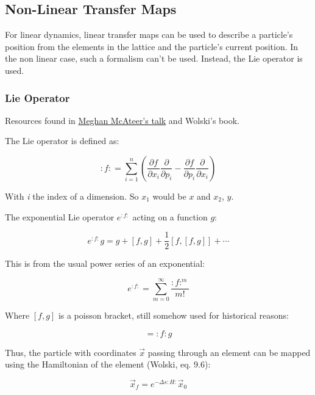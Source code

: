 \documentclass[openright,twoside,headsepline,bibliography=totoc]{scrbook}
\begin{document}
\hypertarget{non-linear-transfer-maps}{%
\subsection{Non-Linear Transfer Maps}\label{non-linear-transfer-maps}}

For linear dynamics, linear transfer maps can be used to describe a
particle's position from the elements in the lattice and the particle's
current position. In the non linear case, such a formalism can't be
used. Instead, the Lie operator is used.

\hypertarget{lie-operator}{%
\subsubsection{Lie Operator}\label{lie-operator}}

Resources found in
\href{https://mlegarre.web.cern.ch/mlegarre/Courses/Meghan_RDTpresentation.pdf}{Meghan
McAteer's talk} and Wolski's book.

The Lie operator is defined as:

\[
\colon f \colon = \sum^n_{i=1} \left(\frac{\partial f}{\partial x_i} \frac{\partial}{\partial p_i} 
                           - \frac{\partial f}{\partial p_i} \frac{\partial}{\partial x_i}
                      \right)
\]

With \emph{i} the index of a dimension. So \(x_1\) would be \(x\) and
\(x_2\), \(y\).

The exponential Lie operator \(e^{:f:}\) acting on a function \(g\):

\begin{equation}e^{:f:}g = g + [f, g] + \frac{1}{2} [f, [f, g]] + \cdots\label{eq:Lie}\end{equation}

This is from the usual power series of an exponential:

\[e^{:f:} = \sum^{\infty}_{m=0} \frac{:f:^m}{m!}\]

Where \([f, g]\) is a poisson bracket, still somehow used for historical
reasons:

\begin{equation}[f, g] = \colon f \colon g
\label{eq:poisson_bracket}\end{equation}

Thus, the particle with coordinates \(\vec{x}\) passing through an
element can be mapped using the Hamiltonian of the element (Wolski, eq.
9.6):

\begin{equation}\vec{x}_f = e^{-\Delta s:H:} \vec{x}_0\label{eq:position_non_linear}\end{equation}
\end{document}
